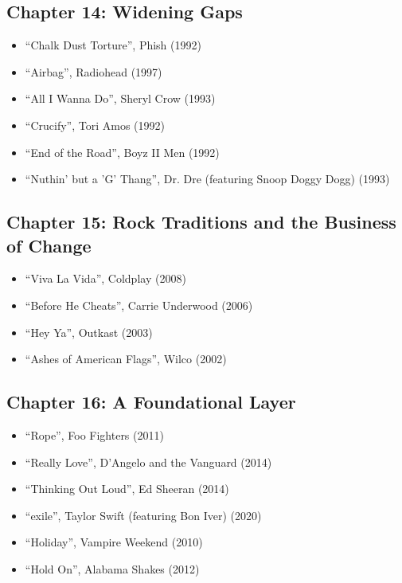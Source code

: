 \documentclass[12pt, a4paper]{book}
\begin{document}
\subsection*{Chapter 14: Widening Gaps}
\begin{itemize}
    \item ``Chalk Dust Torture'', Phish (1992)
    \item ``Airbag'', Radiohead (1997)
    \item ``All I Wanna Do'', Sheryl Crow (1993)
    \item ``Crucify'', Tori Amos (1992)
    \item ``End of the Road'', Boyz II Men (1992)
    \item ``Nuthin' but a 'G' Thang'', Dr. Dre (featuring Snoop Doggy Dogg) (1993)
\end{itemize}

\subsection*{Chapter 15: Rock Traditions and the Business of Change}
\begin{itemize}
    \item ``Viva La Vida'', Coldplay (2008)
    \item ``Before He Cheats'', Carrie Underwood (2006)
    \item ``Hey Ya'', Outkast (2003)
    \item ``Ashes of American Flags'', Wilco (2002)
\end{itemize}

\subsection*{Chapter 16: A Foundational Layer}
\begin{itemize}
    \item ``Rope'', Foo Fighters (2011)
    \item ``Really Love'', D'Angelo and the Vanguard (2014)
    \item ``Thinking Out Loud'', Ed Sheeran (2014)
    \item ``exile'', Taylor Swift (featuring Bon Iver) (2020)
    \item ``Holiday'', Vampire Weekend (2010)
    \item ``Hold On'', Alabama Shakes (2012)
\end{itemize}
\end{document}
